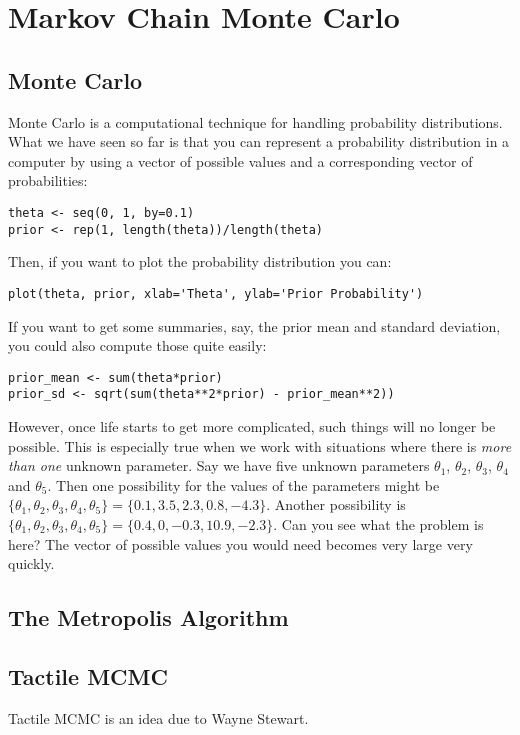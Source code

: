 \chapter{Markov Chain Monte Carlo}

\section{Monte Carlo}
Monte Carlo is a computational technique for handling probability distributions.
What we have seen so far is that you can represent a probability distribution
in a computer by using a vector of possible values and a corresponding
vector of probabilities:
\begin{verbatim}
theta <- seq(0, 1, by=0.1)
prior <- rep(1, length(theta))/length(theta)
\end{verbatim}
Then, if you want to plot the probability distribution you can:
\begin{verbatim}
plot(theta, prior, xlab='Theta', ylab='Prior Probability')
\end{verbatim}
If you want to get some summaries, say, the prior mean and standard deviation,
you could also compute those quite easily:
\begin{verbatim}
prior_mean <- sum(theta*prior)
prior_sd <- sqrt(sum(theta**2*prior) - prior_mean**2))
\end{verbatim}
However, once life starts to get more complicated, such things will no longer
be possible. This is especially true when we work with situations where there
is {\it more than one} unknown parameter. Say we have five unknown parameters
$\theta_1$, $\theta_2$, $\theta_3$, $\theta_4$ and $\theta_5$. Then one
possibility for the values of the parameters might be
$\{\theta_1, \theta_2, \theta_3, \theta_4, \theta_5\} =
\{0.1, 3.5, 2.3, 0.8, -4.3\}$. Another possibility is
$\{\theta_1, \theta_2, \theta_3, \theta_4, \theta_5\} =
\{0.4, 0, -0.3, 10.9, -2.3\}$. Can you see what the problem is here?
The vector of possible values you would need becomes very large very
quickly.




\section{The Metropolis Algorithm}

\section{Tactile MCMC}

Tactile MCMC is an idea due to Wayne Stewart.
